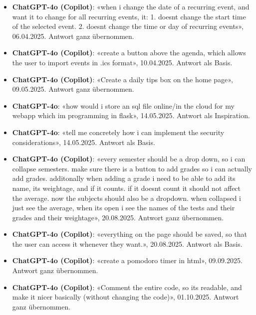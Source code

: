 \documentclass[12pt, a4paper]{article}
\begin{document}
\begin{itemize}
    \item \textbf{ChatGPT-4o (Copilot)}: «when i change the date of a recurring event, and want it to change for all recurring events, it: 1. doesnt change the start time of the selected event. 2. doesnt change the time or day of recurring events», 06.04.2025. Antwort ganz übernommen.
    
    \item \textbf{ChatGPT-4o (Copilot)}: «create a button above the agenda, which allows the user to import events in .ics format», 10.04.2025. Antwort als Basis.
    
    \item \textbf{ChatGPT-4o (Copilot)}: «Create a daily tips box on the home page», 09.05.2025. Antwort ganz übernommen.
    
    \item \textbf{ChatGPT-4o}: «how would i store an sql file online/in the cloud for my webapp which im programming in flask», 14.05.2025. Antwort als Inspiration.
    
    \item \textbf{ChatGPT-4o}: «tell me concretely how i can implement the security considerations», 14.05.2025. Antwort als Basis.
    
    \item \textbf{ChatGPT-4o (Copilot)}: «every semester should be a drop down, so i can collapse semesters. make sure there is a button to add grades so i can actually add grades. additonally when adding a grade i need to be able to add its name, its weightage, and if it counts. if it doesnt count it should not affect the average. now the subjects should also be a dropdown. when collapsed i just see the average, when its open i see the names of the tests and their grades and their weightage», 20.08.2025. Antwort ganz übernommen.
    
    \item \textbf{ChatGPT-4o (Copilot)}: «everything on the page should be saved, so that the user can access it whenever they want.», 20.08.2025. Antwort als Basis.
    
    \item \textbf{ChatGPT-4o (Copilot)}: «create a pomodoro timer in html», 09.09.2025. Antwort ganz übernommen.
    
    \item \textbf{ChatGPT-4o (Copilot)}: «Comment the entire code, so its readable, and make it nicer basically (without changing the code)», 01.10.2025. Antwort ganz übernommen.
    

\end{itemize}
\end{document}
